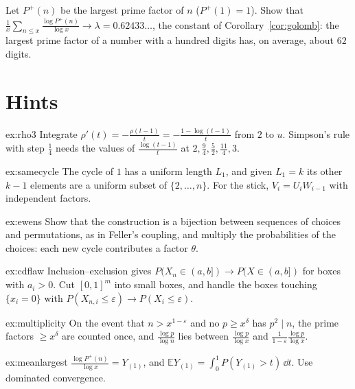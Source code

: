 \begin{exercise}[$\star\star$]\label{ex:meanlargest}
Let $P^+(n)$ be the largest prime factor of $n$ ($P^+(1)=1$). Show that $\frac1x\sum_{n\le x}\frac{\log P^+(n)}{\log x}\to\lambda=0.62433\ldots$, the constant of Corollary~\ref{cor:golomb}: the largest prime factor of a number with a hundred digits has, on average, about $62$ digits.
\end{exercise}

\section{Hints}

\begin{hint}{ex:rho3}
Integrate $\rho'(t)=-\frac{\rho(t-1)}t=-\frac{1-\log(t-1)}t$ from $2$ to $u$. Simpson's rule with step $\frac14$ needs the values of $\frac{\log(t-1)}t$ at $2,\frac94,\frac52,\frac{11}4,3$.
\end{hint}

\begin{hint}{ex:samecycle}
The cycle of $1$ has a uniform length $L_1$, and given $L_1=k$ its other $k-1$ elements are a uniform subset of $\{2,\dots,n\}$. For the stick, $V_i=U_iW_{i-1}$ with independent factors.
\end{hint}

\begin{hint}{ex:ewens}
Show that the construction is a bijection between sequences of choices and permutations, as in Feller's coupling, and multiply the probabilities of the choices: each new cycle contributes a factor $\theta$.
\end{hint}

\begin{hint}{ex:cdflaw}
Inclusion--exclusion gives $P(X_n\in(a,b])\to P(X\in(a,b])$ for boxes with $a_i>0$. Cut $[0,1]^m$ into small boxes, and handle the boxes touching $\{x_i=0\}$ with $P(X_{n,i}\le\varepsilon)\to P(X_i\le\varepsilon)$.
\end{hint}

\begin{hint}{ex:multiplicity}
On the event that $n>x^{1-\varepsilon}$ and no $p\ge x^{\delta}$ has $p^2\mid n$, the prime factors $\ge x^\delta$ are counted once, and $\frac{\log p}{\log n}$ lies between $\frac{\log p}{\log x}$ and $\frac1{1-\varepsilon}\frac{\log p}{\log x}$.
\end{hint}

\begin{hint}{ex:meanlargest}
$\frac{\log P^+(n)}{\log x}=Y_{(1)}$, and $\mathbb EY_{(1)}=\int_0^1P(Y_{(1)}>t)\,\dd t$. Use dominated convergence.
\end{hint}

